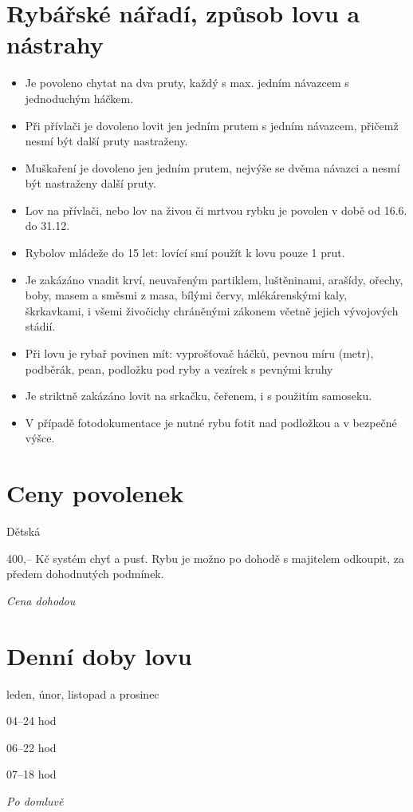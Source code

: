 \documentclass[egregdoesnotlikesansseriftitles,a4paper,fontsize=12pt]{scrartcl}
\begin{document}
\section*{Rybářské nářadí, způsob lovu a nástrahy}
\begin{itemize}
\item Je povoleno chytat na dva pruty, každý s max. jedním návazcem s jednoduchým háčkem.
\item Při přívlači je dovoleno lovit jen jedním prutem s jedním návazcem, přičemž nesmí být další pruty nastraženy.
\item Muškaření je dovoleno jen jedním prutem, nejvýše se dvěma návazci a nesmí být nastraženy další pruty.
\item Lov na přívlači, nebo lov na živou či mrtvou rybku je povolen v době od 16.6. do 31.12.
\item Rybolov mládeže do 15 let: lovící smí použít k lovu pouze 1 prut.
\item Je zakázáno vnadit krví, neuvařeným partiklem, luštěninami, arašídy, ořechy, boby, masem a směsmi z masa, bílými červy, mlékárenskými kaly, škrkavkami, i všemi živočichy chráněnými zákonem včetně jejich vývojových stádií.
\item Při lovu je rybař povinen mít: vyprošťovač háčků, pevnou míru (metr), podběrák, pean, podložku pod ryby a vezírek s pevnými  kruhy
\item Je striktně zakázáno lovit na srkačku, čeřenem, i s použitím samoseku.
\item V případě fotodokumentace je nutné rybu fotit nad podložkou a v bezpečné výšce.
\end{itemize}

\pagebreak
\section*{Ceny povolenek}
\begin{labeling}{Dětská\quad}
    \item[Denní] 400,-- Kč systém chyť a pusť. Rybu je možno po dohodě s majitelem odkoupit, za předem dohodnutých podmínek.
    \item[Dětská] \textit{Cena dohodou}
\end{labeling}

\section*{Denní doby lovu}
\begin{labeling}{leden, únor, listopad a prosinec\quad}
\item[Květen--srpen] 04--24 hod
\item[Březen, duben, září a říjen] 06--22 hod
\item[Leden, únor, listopad a prosinec] 07--18 hod
\item[Noční lov] \textit{Po domluvě}
\end{labeling}
\end{document}
